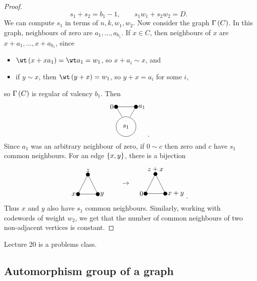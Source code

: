 \begin{proof}
$$ s_1 + s_2 = b_1 - 1, \qquad s_1w_1 + s_2w_2 = D. $$
We can compute $ s_1 $ in terms of $ n, k, w_1, w_2 $. Now consider the graph $ \Gamma\br{C} $. In this graph, neighbours of zero are $ a_1, \dots, a_{b_1} $. If $ x \in C $, then neighbours of $ x $ are $ x + a_1, \dots, x + a_{b_1} $, since
\begin{itemize}
\item $ \wt \br{x + xa_1} = \wt a_1 = w_1 $, so $ x + a_i \sim x $, and
\item if $ y \sim x $, then $ \wt \br{y + x} = w_1 $, so $ y + x = a_i $ for some $ i $,
\end{itemize}
so $ \Gamma\br{C} $ is regular of valency $ b_1 $. Then
$$
\begin{tikzpicture}
\fill (0, 0) circle (0.1) node[left]{$ 0 $};
\fill (1, 0) circle (0.1) node[right]{$ a_1 $};
\draw (0.5, -1) circle (0.5) node{$ s_1 $};
\draw (0, 0) to (1, 0);
\draw (0, 0) to (0.3, -0.5);
\draw (1, 0) to (0.7, -0.5);
\end{tikzpicture}.
$$
Since $ a_1 $ was an arbitrary neighbour of zero, if $ 0 \sim c $ then zero and $ c $ have $ s_1 $ common neighbours. For an edge $ \cbr{x, y} $, there is a bijection
$$
\begin{tikzpicture}
\fill (0, 0) circle (0.1) node[above]{$ z $};
\fill (-0.5, -1) circle (0.1) node[left]{$ x $};
\fill (0.5, -1) circle (0.1) node[right]{$ y $};
\draw (0, 0) to (-0.5, -1);
\draw (0, 0) to (0.5, -1);
\draw (-0.5, -1) to (0.5, -1);
\end{tikzpicture}
\qquad
\begin{tikzpicture}
\draw (-1.5, -0.5) node{$ \to $};
\fill (0, 0) circle (0.1) node[above]{$ z + x $};
\fill (-0.5, -1) circle (0.1) node[left]{$ 0 $};
\fill (0.5, -1) circle (0.1) node[right]{$ x + y $};
\draw (0, 0) to (-0.5, -1);
\draw (0, 0) to (0.5, -1);
\draw (-0.5, -1) to (0.5, -1);
\end{tikzpicture}.
$$
Thus $ x $ and $ y $ also have $ s_1 $ common neighbours. Similarly, working with codewords of weight $ w_2 $, we get that the number of common neighbours of two non-adjacent vertices is constant.
\end{proof}


Lecture 20 is a problems class.

\pagebreak

\subsection{Automorphism group of a graph}

